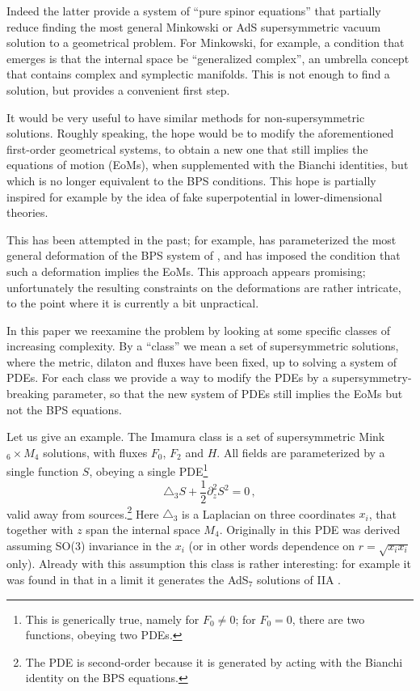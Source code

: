 \documentclass[12pt]{article}
\begin{document}
Indeed the latter provide a system of ``pure spinor equations'' \cite{gmpt2} that partially reduce finding the most general Minkowski or AdS supersymmetric vacuum solution to a geometrical problem. For Minkowski, for example, a condition that emerges is that the internal space be ``generalized complex'', an umbrella concept that contains complex and symplectic manifolds. This is not enough to find a solution, but provides a convenient first step. 

It would be very useful to have similar methods for non-supersymmetric solutions. Roughly speaking, the hope would be to modify the aforementioned first-order geometrical systems, to obtain a new one that still implies the equations of motion (EoMs), when supplemented with the Bianchi identities, but which is no longer equivalent to the BPS conditions. This hope is partially inspired for example by the idea of fake superpotential in lower-dimensional theories. 

This has been attempted in the past; for example, \cite{lust-marchesano-martucci-tsimpis} has parameterized the most general deformation of the BPS system of \cite{gmpt2}, and has imposed the condition that such a deformation implies the EoMs. This approach appears promising; unfortunately the resulting constraints on the deformations are rather intricate, to the point where it is currently a bit unpractical. 

In this paper we reexamine the problem by looking at some specific classes of increasing complexity. By a ``class'' we mean a set of supersymmetric solutions, where the metric, dilaton and fluxes have been fixed, up to solving a system of PDEs. For each class we provide a way to modify the PDEs by a supersymmetry-breaking parameter, so that the new system of PDEs still implies the EoMs but not the BPS equations. 

Let us give an example. The Imamura class \cite{imamura} is a set of supersymmetric Mink$_6\times M_4$ solutions, with fluxes $F_0$, $F_2$ and $H$. All fields are parameterized by a single function $S$, obeying a single PDE\footnote{This is generically true, namely for $F_0\neq 0$; for $F_0=0$, there are two functions, obeying two PDEs.} 
\begin{equation}\label{eq:ima-intro}
	\triangle_3 S + \frac12 \partial^2_z S^2 =0 \,,
\end{equation}
valid away from sources.\footnote{The PDE is second-order because it is generated by acting with the Bianchi identity on the BPS equations.} Here $\triangle_3$ is a Laplacian on three coordinates $x_i$, that together with $z$ span the internal space $M_4$. Originally in \cite{imamura} this PDE was derived assuming SO(3) invariance in the $x_i$ (or in other words dependence on $r=\sqrt{x_i x_i}$ only). Already with this assumption this class is rather interesting: for example it was found in \cite{bobev-dibitetto-gautason-trujien,macpherson-t} that in a limit it generates the AdS$_7$ solutions of IIA \cite{afrt}. 
\end{document}
